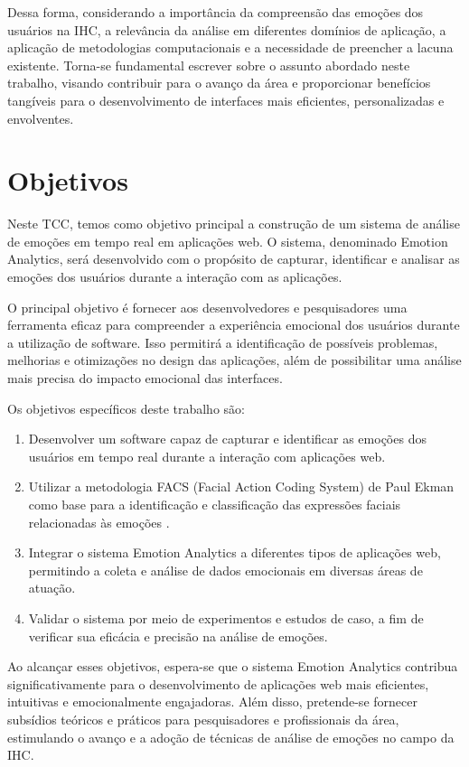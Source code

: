 Dessa forma, considerando a importância da compreensão das emoções dos usuários na IHC, a relevância da análise em diferentes domínios de aplicação, a aplicação de metodologias computacionais e a necessidade de preencher a lacuna existente. Torna-se fundamental escrever sobre o assunto abordado neste trabalho, visando contribuir para o avanço da área e proporcionar benefícios tangíveis para o desenvolvimento de interfaces mais eficientes, personalizadas e envolventes.

\section {Objetivos}

Neste TCC, temos como objetivo principal a construção de um sistema de análise de emoções em tempo real em aplicações web. O sistema, denominado Emotion Analytics, será desenvolvido com o propósito de capturar, identificar e analisar as emoções dos usuários durante a interação com as aplicações.

O principal objetivo é fornecer aos desenvolvedores e pesquisadores uma ferramenta eficaz para compreender a experiência emocional dos usuários durante a utilização de software. Isso permitirá a identificação de possíveis problemas, melhorias e otimizações no design das aplicações, além de possibilitar uma análise mais precisa do impacto emocional das interfaces.

Os objetivos específicos deste trabalho são:

\begin{enumerate}
  \item Desenvolver um software capaz de capturar e identificar as emoções dos usuários em tempo real durante a interação com aplicações web.
  \item Utilizar a metodologia FACS (Facial Action Coding System) de Paul Ekman como base para a identificação e classificação das expressões faciais relacionadas às emoções \cite{5}.
  \item Integrar o sistema Emotion Analytics a diferentes tipos de aplicações web, permitindo a coleta e análise de dados emocionais em diversas áreas de atuação.
  \item Validar o sistema por meio de experimentos e estudos de caso, a fim de verificar sua eficácia e precisão na análise de emoções.
\end{enumerate}
  
Ao alcançar esses objetivos, espera-se que o sistema Emotion Analytics contribua significativamente para o desenvolvimento de aplicações web mais eficientes, intuitivas e emocionalmente engajadoras. Além disso, pretende-se fornecer subsídios teóricos e práticos para pesquisadores e profissionais da área, estimulando o avanço e a adoção de técnicas de análise de emoções no campo da IHC.


